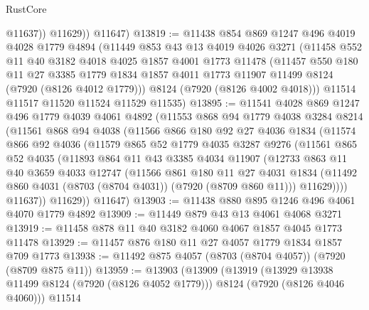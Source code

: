 \begin{lexlean}{RustCore}
\begin{coremodule}
              @11637))
          @11629))
      @11647)
@13819 := @11438
    @854
    @869
    @1247
    @496
    @4019
    @4028
    @1779
    @4894
    (@11449
      @853
      @43
      @13
      @4019
      @4026
      @3271
      (@11458
        @552
        @11
        @40
        @3182
        @4018
        @4025
        @1857
        @4001
        @1773
        @11478
        (@11457
          @550
          @180
          @11
          @27
          @3385
          @1779
          @1834
          @1857
          @4011
          @1773
          @11907
          @11499
          @8124
          (@7920 (@8126 @4012 @1779)))
        @8124
        (@7920 (@8126 @4002 @4018)))
      @11514
      @11517
      @11520
      @11524
      @11529
      @11535)
@13895 := @11541
    @4028
    @869
    @1247
    @496
    @1779
    @4039
    @4061
    @4892
    (@11553
      @868
      @94
      @1779
      @4038
      @3284
      @8214
      (@11561
        @868
        @94
        @4038
        (@11566
          @866
          @180
          @92
          @27
          @4036
          @1834
          (@11574
            @866
            @92
            @4036
            (@11579
              @865
              @52
              @1779
              @4035
              @3287
              @9276
              (@11561
                @865
                @52
                @4035
                (@11893
                  @864
                  @11
                  @43
                  @3385
                  @4034
                  @11907
                  (@12733
                    @863
                    @11
                    @40
                    @3659
                    @4033
                    @12747
                    (@11566
                      @861
                      @180
                      @11
                      @27
                      @4031
                      @1834
                      (@11492 @860 @4031 (@8703 (@8704 @4031)) (@7920 (@8709 @860 @11)))
                      @11629))))
              @11637))
          @11629))
      @11647)
@13903 := @11438 @880 @895 @1246 @496 @4061 @4070 @1779 @4892
@13909 := @11449 @879 @43 @13 @4061 @4068 @3271
@13919 := @11458 @878 @11 @40 @3182 @4060 @4067 @1857 @4045 @1773 @11478
@13929 := @11457 @876 @180 @11 @27 @4057 @1779 @1834 @1857 @709 @1773
@13938 := @11492 @875 @4057 (@8703 (@8704 @4057)) (@7920 (@8709 @875 @11))
@13959 := @13903
    (@13909
      (@13919
        (@13929 @13938 @11499 @8124 (@7920 (@8126 @4052 @1779)))
        @8124
        (@7920 (@8126 @4046 @4060)))
      @11514

\end{coremodule}
\end{lexlean}
